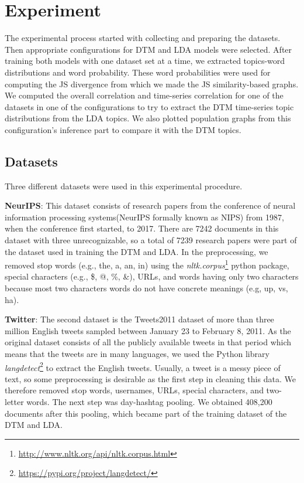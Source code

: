 \chapter{Experiment}
The experimental process started with collecting and preparing the datasets. Then appropriate configurations for DTM and LDA models were selected. After training both models with one dataset set at a time, we extracted topics-word distributions and word probability. These word probabilities were used for computing the JS divergence from which we made the JS similarity-based graphs. We computed the overall correlation and time-series correlation for one of the datasets in one of the configurations to try to extract the DTM time-series topic distributions from the LDA topics. We also plotted population graphs from this configuration's inference part to compare it with the DTM topics.

\section{Datasets}
Three different datasets were used in this experimental procedure.

\textbf{NeurIPS}: This dataset consists of research papers from the conference of neural information processing systems(NeurIPS formally known as NIPS) from 1987, when the conference first started, to 2017. There are 7242 documents in this dataset with three unrecognizable, so a total of 7239 research papers were part of the dataset used in training the DTM and LDA.  In the preprocessing, we removed stop words (e.g., the, a, an, in) using the \textit{nltk.corpus}\footnote{\url{http://www.nltk.org/api/nltk.corpus.html}} python package, special characters (e.g., \$, @, \%, \&), URLs, and words having only two characters because most two characters words do not have concrete meanings (e.g, up, vs, ha).

\textbf{Twitter}: The second dataset is the Tweets2011 dataset of more than three million English tweets sampled between January 23 to February 8, 2011. As the original dataset consists of all the publicly available tweets in that period which means that the tweets are in many languages, we used the Python library \textit{langdetect}\footnote{\url{https://pypi.org/project/langdetect/}} to extract the English tweets. Usually, a tweet is a messy piece of text, so some preprocessing is desirable as the first step in cleaning this data.
We therefore removed stop words, usernames, URLs, special characters, and two-letter words. The next step was day-hashtag pooling. We obtained 408,200 documents after this pooling, which became part of the training dataset of the DTM and LDA.

